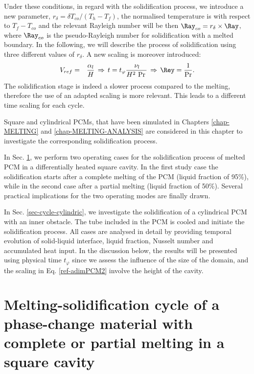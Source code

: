 Under these conditions, in regard with the solidification process, we introduce  a new parameter,  $r_{\delta} = \delta T_{co}/(T_h-T_f)$, the normalised temperature is with respect to 
$T_f-T_{co}$ and the relevant Rayleigh number will be then  $\Ray_{co}= r_{\delta} \times \Ray$, where $\Ray_{co}$ is the pseudo-Rayleigh number for solidification with a melted boundary. 
In the following, we will  describe  the process of solidification using three different values of $r_{\delta}$. 
A new scaling is moreover introduced: 
\begin{eqnarray}\label{ref-adimPCM2}
V_{ref}&=&\frac{\alpha_l}{H}  \, \Rightarrow  \, t = t_{\varphi} \frac{\, \nu_l }{ H^2 \, \Pr \,}\, \Rightarrow  \, \Rey  = \frac{1}{\Pr}.  \label{ref-adimdT} 
\end{eqnarray}
The solidification stage is indeed a slower process compared to the melting, therefore the use of an adapted scaling is more relevant.
This leads to a different time scaling for each cycle.

Square and cylindrical PCMs, that have been simulated in Chapters \ref{chap-MELTING} and \ref{chap-MELTING-ANALYSIS} are considered in this chapter to investigate the corresponding solidification process.

\noindent In Sec. \ref{sec-cycle-square}, we perform two operating cases for the solidification process of melted PCM in a differentially heated square cavity.
In the first study case the solidification starts after a  complete melting of the PCM (liquid fraction of 95\%), while in the second case after a partial melting (liquid fraction of 50\%). 
Several practical implications for the two operating modes are finally drawn.

\noindent In Sec. \ref{sec-cycle-cylindric}, we investigate the solidification of a cylindrical PCM with an inner obstacle.
The tube included in the PCM is cooled and initiate the solidification process.
All cases are analysed in detail by providing temporal evolution of solid-liquid interface, liquid fraction, Nusselt number and accumulated heat input. 
In the discussion below,  the results will be presented using physical time $t_{\varphi}$ since we assess the influence of the size of the domain, and the scaling in Eq. \ref{ref-adimPCM2} involve the height of the cavity.


\newpage
\section{Melting-solidification cycle of a phase-change material with complete or partial melting in a square cavity} \label{sec-cycle-square}


